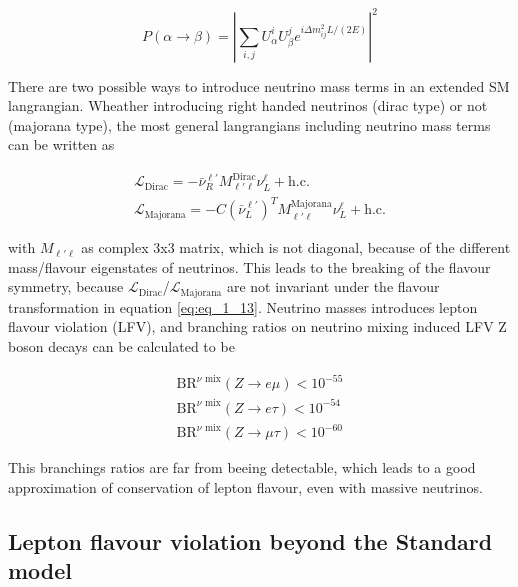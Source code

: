 \begin{equation}
	\label{eq:eq_1_14}
	P(\alpha \rightarrow \beta) = |\sum_{i, j} U_{\alpha}^{i} U_{\beta}^{j} e^{i\Delta m^2_{ij}L/(2E)}|^2
\end{equation}

There are two possible ways to introduce neutrino mass terms in an extended \gls{SM} langrangian. Wheather introducing right handed neutrinos (dirac type) or not (majorana type), the most general langrangians including neutrino mass terms \cite{NEUTRINOMASS} can be written as 

\begin{equation}
	\label{eq:eq_1_15}
	\begin{split}
		\mathcal{L}_{\text{Dirac}} = -\bar{\nu}^{\ell'}_{R}M^{\text{Dirac}}_{\ell'\ell} \nu^{\ell}_{L} + \text{h.c.} \\
		\mathcal{L}_{\text{Majorana}} = -C(\bar{\nu}^{\ell'}_{L})^{T}M^{\text{Majorana}}_{\ell'\ell} \nu^{\ell}_{L} + \text{h.c.} 
	\end{split}
\end{equation}

with $M_{\ell'\ell}$ as complex 3x3 matrix, which is not diagonal, because of the different mass/flavour eigenstates of neutrinos. This leads to the breaking of the flavour symmetry, because $\mathcal{L}_{\text{Dirac}}$/$\mathcal{L}_{\text{Majorana}}$ are not invariant under the flavour transformation in equation \ref{eq:eq_1_13}. Neutrino masses introduces lepton flavour violation (\gls{LFV}), and branching ratios on neutrino mixing induced \gls{LFV} Z boson decays \cite{NEUTRINOLFV} can be calculated to be 

\begin{equation}
	\label{eq:eq_1_16}
	\begin{split}
		\text{BR}^{\nu \text{ mix}}(Z\to e\mu) < 10^{-55} \\
		\text{BR}^{\nu \text{ mix}}(Z\to e\tau) < 10^{-54} \\
		\text{BR}^{\nu \text{ mix}}(Z\to \mu\tau) < 10^{-60}
	\end{split}
\end{equation}

This branchings ratios are far from beeing detectable, which leads to a good approximation of conservation of lepton flavour, even with massive neutrinos.

\subsection{Lepton flavour violation beyond the Standard model}
\label{sec:section_1_3_3}

